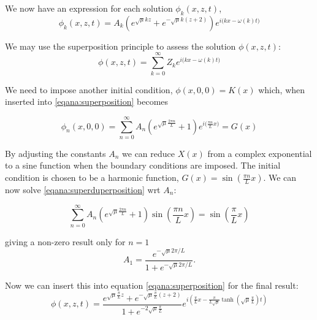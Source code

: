 \documentclass[11pt]{article}
\begin{document}
We now have an expression for each solution $\phi_k(x,z,t)$,
\begin{equation*}
\phi_k(x,z,t) = A_k \left( e^{\sqrt{\mu}kz} + e^{-\sqrt{\mu}k(z+2)} \right) e^{i\big( kx - \omega(k)t \big)}
\end{equation*}

We may use the superposition principle to assess the solution $\phi(x,z,t)$:
\begin{equation}
\label{eqana:superposition}
\phi(x,z,t) = \sum_{k=0}^{\infty} Z_k e^{i\big(kx - \omega(k) t \big)}
\end{equation}

We need to impose another initial condition, $\phi(x,0,0) = K(x)$ which, when inserted into \ref{eqana:superposition} becomes

\begin{equation}
\phi_n(x,0,0) = \sum_{n=0}^{\infty} A_n \left( e^{\sqrt{\mu}\frac{2 \pi n}{L}} + 1 \right) e^{ i \big( \frac{\pi n}{L}x \big) } = G(x)
\label{eqana:superduperposition}
\end{equation}

By adjusting the constants $A_n$ we can reduce $X(x)$ from a complex exponential to a sine function when the boundary conditions are imposed. The initial condition is chosen to be a harmonic function, $G(x) = \sin \left(\frac{\pi n}{L}x \right)$. We can now solve \ref{eqana:superduperposition} wrt $A_n$:

\begin{equation*}
\sum_{n=0}^{\infty} A_n \left( e^{\sqrt{\mu}\frac{2 \pi n}{L}} + 1 \right) \sin \left(\frac{\pi n}{L}x \right) = \sin \left( \frac{\pi }{L}x \right)
\end{equation*}

giving a non-zero result only for $n=1$
\begin{equation*}
A_1 = \frac{e^{- \sqrt{\mu}2\pi  /L } }{1 + e^{- \sqrt{\mu} 2\pi /L}}.
\end{equation*}


Now we can insert this into equation \ref{eqana:superposition} for the final result:
\begin{equation*}
\phi(x,z,t) = \frac{ e^{ \sqrt{\mu} \frac{\pi }{L}z}  + e^{ -\sqrt{\mu}\frac{\pi }{L}(z+2)    }}{1 + e^{-2\sqrt{\mu}\frac{\pi }{L} }} e^{i \left( \frac{\pi }{L}x - \frac{\pi }{L\sqrt{\mu}} \tanh (\sqrt{\mu}\frac{\pi }{L})t \right)}
\end{equation*}
\end{document}
